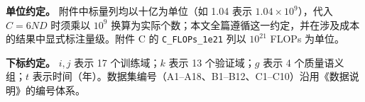 \noindent\textbf{单位约定。} 附件中标量列均以十亿为单位（如 1.04 表示 $1.04\times10^9$），代入 $C=6ND$ 时须乘以 $10^9$ 换算为实际个数；本文全篇遵循这一约定，并在涉及成本的结果中显式标注量级。附件 C 的 \texttt{C\_FLOPs\_1e21} 列以 $10^{21}$ FLOPs 为单位。

\noindent\textbf{下标约定。} $i,j$ 表示 17 个训练域；$k$ 表示 13 个验证域；$g$ 表示 4 个质量语义组；$t$ 表示时间（年）。数据集编号（A1--A18、B1--B12、C1--C10）沿用《数据说明》的编号体系。
